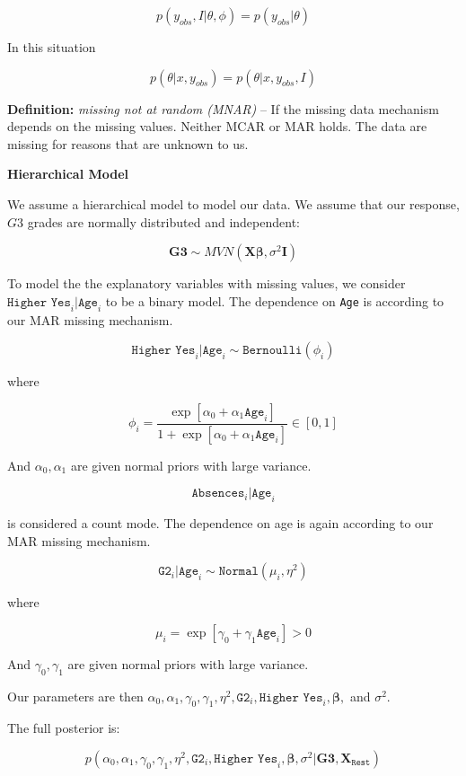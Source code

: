 \documentclass[11pt]{article}
\begin{document}
$$p(y_{obs},I|\theta, \phi) = p(y_{obs}|\theta)$$

In this situation

$$p(\theta|x, y_{obs}) = p(\theta|x, y_{obs}, I)$$

\vspace{0.25in}

\textbf{Definition:} \textit{missing not at random (MNAR)} -- If the missing data mechanism depends on the missing values. Neither MCAR or MAR holds. The data are missing for reasons that are unknown to us. 

\vspace{0.5in}

\textbf{Hierarchical Model}

We assume a hierarchical model to model our data. We assume that our response, $G3$ grades are normally distributed and independent:

$$\mathbf{G3} \sim MVN(\mathbf{X}\mathbf{\beta}, \sigma^2\mathbf{I})$$

To model the the explanatory variables with missing values, we consider $\texttt{Higher Yes}_i|\texttt{Age}_i$ to be a binary model. The dependence on \texttt{Age} is according to our MAR missing mechanism.

$$\texttt{Higher Yes}_i|\texttt{Age}_i \sim \texttt{Bernoulli}(\phi_i)$$

where

$$\phi_i=\frac{\exp[\alpha_0+\alpha_1\texttt{Age}_i]}{1+\exp[\alpha_0+\alpha_1\texttt{Age}_i]} \in [0,1]$$

And $\alpha_0, \alpha_1$ are given normal priors with large variance.

$$\texttt{Absences}_i|\texttt{Age}_i$$

is considered a count mode. The dependence on age is again according to our MAR missing mechanism. 

$$\texttt{G2}_i|\texttt{Age}_i \sim \texttt{Normal}(\mu_i, \eta^2)$$

where

$$\mu_i=\exp[\gamma_0+\gamma_1\texttt{Age}_i]  > 0$$

And $\gamma_0, \gamma_1$ are given normal priors with large variance.

Our parameters are then $\alpha_0, \alpha_1, \gamma_0, \gamma_1, \eta^2, \texttt{G2}_i, \texttt{Higher Yes}_i, \mathbf{\beta},$ and $\sigma^2$.

The full posterior is:

$$p(\alpha_0, \alpha_1, \gamma_0, \gamma_1, \eta^2, \texttt{G2}_i, \texttt{Higher Yes}_i, \mathbf{\beta},\sigma^2|\mathbf{G3}, \mathbf{X}_{\texttt{Rest}})$$
\end{document}
